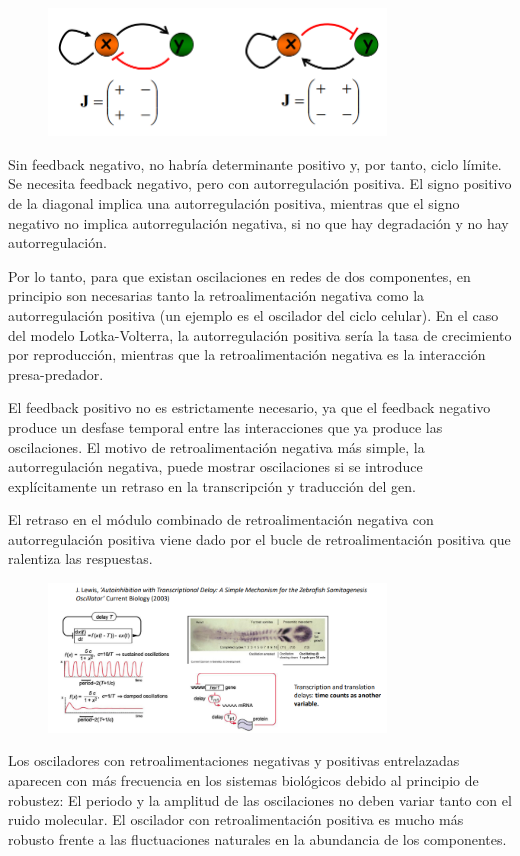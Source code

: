 \begin{figure}[h]
\centering
\includegraphics[width = 0.8\textwidth]{figs/feedback-jacobiano.png}
\end{figure}

Sin feedback negativo, no habría determinante positivo y, por tanto, ciclo límite. Se necesita feedback negativo, pero con autorregulación positiva. El signo positivo de la diagonal implica una autorregulación positiva, mientras que el signo negativo no implica autorregulación negativa, si no que hay degradación y no hay autorregulación. 

Por lo tanto, para que existan oscilaciones en redes de dos componentes, en principio son necesarias tanto la retroalimentación negativa como la autorregulación positiva (un ejemplo es el oscilador del ciclo celular). En el caso del modelo Lotka-Volterra, la autorregulación positiva sería la tasa de crecimiento por reproducción, mientras que la retroalimentación negativa es la interacción presa-predador. 

El feedback positivo no es estrictamente necesario, ya que el feedback negativo produce un desfase temporal entre las interacciones que ya produce las oscilaciones. El motivo de retroalimentación negativa más simple, la autorregulación negativa, puede mostrar oscilaciones si se introduce explícitamente un retraso en la transcripción y traducción del gen.

El retraso en el módulo combinado de retroalimentación negativa con autorregulación positiva viene dado por el bucle de retroalimentación positiva que ralentiza las respuestas.

\begin{figure}[h]
\centering
\includegraphics[width = 0.8\textwidth]{figs/autoinhibition-delay.png}
\end{figure}

Los osciladores con retroalimentaciones negativas y positivas entrelazadas aparecen con más frecuencia en los sistemas biológicos debido al principio de robustez: El periodo y la amplitud de las oscilaciones no deben variar tanto con el ruido molecular. El oscilador con retroalimentación positiva es mucho más robusto frente a las fluctuaciones naturales en la abundancia de los componentes. 